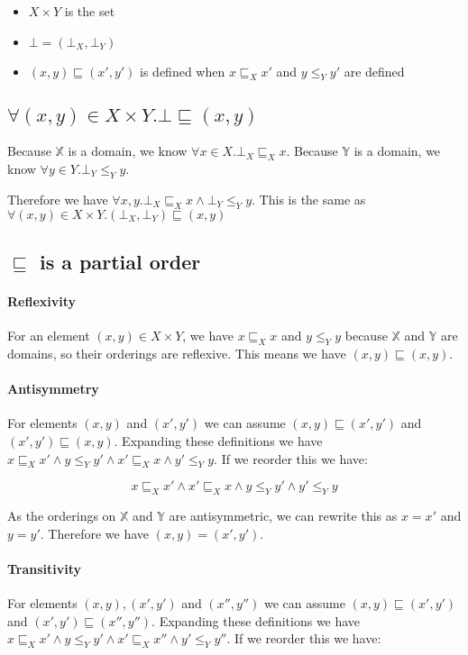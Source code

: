\begin{itemize}
\item{$X \times Y$ is the set}
\item{$\bot = (\bot_X, \bot_Y)$}
\item{$(x,y) \sqsubseteq (x',y')$ is defined when $x \sqsubseteq_X x'$ and $y \leq_Y y'$ are defined}
\end{itemize}

\subsection{$\forall (x,y) \in X \times Y. \bot  \sqsubseteq (x,y)$}
Because $\mathbb{X}$ is a domain, we know $\forall x \in X. \bot_X \sqsubseteq_X x$.
Because $\mathbb{Y}$ is a domain, we know $\forall y \in Y. \bot_Y \leq_Y y$.

Therefore we have $\forall x,y . \bot_X \sqsubseteq_X x \wedge \bot_Y \leq_Y y$. This is the same as $\forall (x,y) \in X \times Y. (\bot_X,\bot_Y) \sqsubseteq (x,y)$

\subsection{$\sqsubseteq $ is a partial order}

\paragraph{Reflexivity} For an element $(x,y) \in X \times Y$, we have $x \sqsubseteq_X x$ and $y \leq_Y y$ because $\mathbb{X}$ and $\mathbb{Y}$ are domains, so their orderings are reflexive. This means we have $(x,y) \sqsubseteq (x,y)$.

\paragraph{Antisymmetry} For elements $(x,y)$ and $(x',y')$ we can assume $(x,y) \sqsubseteq (x',y')$ and $(x',y') \sqsubseteq (x,y)$. Expanding these definitions we have $x \sqsubseteq_X x' \wedge y \leq_Y y' \wedge x' \sqsubseteq_X x \wedge y' \leq_Y y$. If we reorder this we have:

\[x \sqsubseteq_X x' \wedge x' \sqsubseteq_X x \wedge y \leq_Y y' \wedge y' \leq_Y y \]

As the orderings on $\mathbb{X}$ and $\mathbb{Y}$ are antisymmetric, we can rewrite this as $x = x'$ and $y = y'$. Therefore we have $(x,y) = (x',y')$.

\paragraph{Transitivity} For elements $(x,y), (x',y')$ and $(x'',y'')$ we can assume $(x,y) \sqsubseteq (x',y')$ and $(x',y') \sqsubseteq (x'',y'')$. Expanding these definitions we have $x \sqsubseteq_X x' \wedge y \leq_Y y' \wedge x' \sqsubseteq_X x'' \wedge y' \leq_Y y''$. If we reorder this we have:


